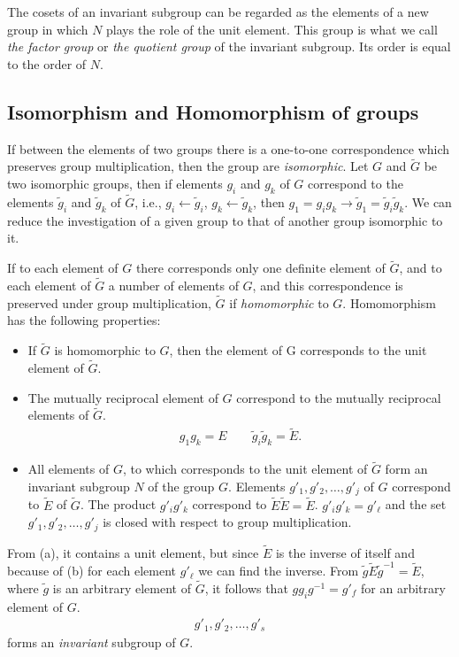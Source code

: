 The cosets of an invariant subgroup can be regarded as the elements of a new
group in which $N$ plays the role of the unit element. This group is what we call
\emph{the factor group} or \emph{the quotient group} of the invariant subgroup.
Its order is equal to the order of $N$.


\subsection{Isomorphism and Homomorphism of groups} %
\label{sub:Isomorphism and Homomorphism of groups}

If between the elements of two groups there is a one-to-one correspondence which
preserves group multiplication, then the group are \emph{isomorphic}. Let $G$ and
$\widetilde{G}$ be two isomorphic groups, then if elements $g_i$ and $g_k$ of $G$
correspond to the elements $\widetilde{g}_i$ and $\widetilde{g}_k$ of
$\widetilde{G}$, i.e., $g_i\leftarrow\widetilde{g}_i$,
$g_k\leftarrow\widetilde{g}_k$, then
$g_1=g_ig_k\rightarrow\widetilde{g}_1=\widetilde{g}_i\widetilde{g}_k$. We can
reduce the investigation of a given group to that of another group isomorphic to
it.

If to each element of $G$ there corresponds only one definite element of
$\widetilde{G}$, and to each element of $\widetilde{G}$ a number of elements of
$G$, and this correspondence is preserved under group multiplication,
$\widetilde{G}$ if \emph{homomorphic} to $G$. Homomorphism has the following
properties:
\begin{itemize}
    \item If $\widetilde{G}$ is homomorphic to $G$, then the element of G
        corresponds to the unit element of $\widetilde{G}$.
    \item The mutually reciprocal element of $G$ correspond to the mutually
        reciprocal elements of $\widetilde{G}$.
        \begin{align}
            g_1g_k=E\qquad \widetilde{g}_i\widetilde{g}_k=\widetilde{E}.
        \end{align}
    \item All elements of $G$, to which corresponds to the unit element of
        $\widetilde{G}$ form an invariant subgroup $N$ of the group $G$. Elements
        $g'_1,g'_2,\dots,g'_j$ of $G$ correspond to $\widetilde{E}$ of
        $\widetilde{G}$. The product $g'_ig'_k$ correspond to
        $\widetilde{E}\widetilde{E}=\widetilde{E}$. $g'_ig'_k=g'_\ell$ and the
        set $g'_1,g'_2,\dots,g'_j$ is closed with respect to group multiplication.
\end{itemize}
From (a), it contains a unit element, but since $\widetilde{E}$ is the inverse
of itself and because of (b) for each element $g'_\ell$ we can find the inverse.
From $\widetilde{g}\widetilde{E}\widetilde{g}^{-1}=\widetilde{E}$, where
$\widetilde{g}$ is an arbitrary element of $\widetilde{G}$, it follows that
$gg_ig^{-1}=g'_f$ for an arbitrary element of $G$.
\begin{align}
    g'_1,g'_2,\dots,g'_s
\end{align}
forms an \emph{invariant} subgroup of $G$.

